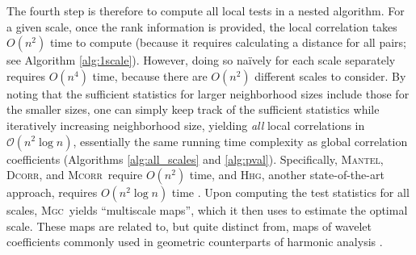 \documentclass[11pt]{article}
\providecommand{\sct}[1]{{\normalfont\textsc{#1}}}
\providecommand{\mc}[1]{\mathcal{#1}}
\newcommand{\Mgc}{\sct{Mgc}}
\newcommand{\Hhg}{\sct{Hhg}}
\newcommand{\Dcorr}{\sct{Dcorr}}
\newcommand{\Mcorr}{\sct{Mcorr}}
\newcommand{\Mantel}{\sct{Mantel}}
\begin{document}


The fourth step is therefore to compute all local tests in a nested algorithm.
For a given scale, once the rank information is provided, the local correlation takes $O(n^2)$ time to compute (because it requires calculating a distance for all pairs; see Algorithm \ref{alg:1scale}). 
% 
However, doing so na\"ively for each scale separately requires $O(n^4)$ time, because there are $O(n^2)$ different scales to consider. 
% 
By noting that the sufficient statistics for larger neighborhood sizes include those for the smaller sizes, one can simply keep track of the sufficient statistics while iteratively increasing neighborhood size, yielding  \emph{all} local correlations in $\mc{O}(n^2 \log n)$, essentially the same running time complexity as  global correlation coefficients (Algorithms \ref{alg:all_scales} and \ref{alg:pval}). Specifically, \Mantel, \Dcorr, and \Mcorr~require $O(n^2)$ time, and \Hhg, another state-of-the-art approach,  requires $O(n^2 \log n)$ time \cite{HellerGorfine2013}.  Upon computing the test statistics for all scales, \Mgc~yields ``multiscale maps'', which it then uses to estimate the optimal scale. These maps are  related to, but quite distinct from, maps of wavelet coefficients commonly used in geometric counterparts of harmonic analysis \cite{Allard2012,MMS:NoisyDictionaryLearning}.

% 
%
%
%
\end{document}
